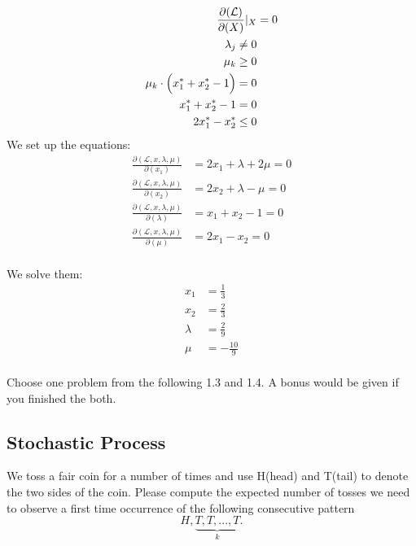 \documentclass[a4paper]{article}
\begin{document}
\begin{equation}
    \begin{aligned}
        \frac{\partial(\mathcal{L})}{\partial(X)}\arrowvert_{X} &=0\\
        \lambda_{j}  \ne 0 \\
        \mu_{k}  \ge 0\\
        \mu_{k} \cdot \Big(x_{1}^{*} + x_{2}^{*} - 1\Big) =0\\
        x_{1}^{*} + x_{2}^{*} - 1 = 0\\
        2x_{1}^{*}  - x_{2}^{*}  \le 0\\
    \end{aligned}
\end{equation}  
We set up the equations:
\begin{equation}
    \begin{aligned}
        \frac{\partial(\mathcal{L},x,\lambda, \mu)}{\partial(x_1)} &=2 x_1 + \lambda +2 \mu = 0\\
        \frac{\partial(\mathcal{L},x,\lambda, \mu)}{\partial(x_2)} &=2 x_2 + \lambda - \mu = 0\\
        \frac{\partial(\mathcal{L},x,\lambda, \mu)}{\partial(\lambda)} &= x_1 + x_2 -1  = 0\\
        \frac{\partial(\mathcal{L},x,\lambda, \mu)}{\partial(\mu)} &= 2 x_1 - x_2 = 0\\
    \end{aligned}
\end{equation} 

We solve them: 
\begin{equation}
    \begin{aligned}
        x_1 &= \frac{1}{3}\\
        x_2 &= \frac{2}{3}\\
        \lambda &= \frac{2}{9}\\
        \mu &= -\frac{10}{9}\\
    \end{aligned}
\end{equation}  

Choose one problem from the following 1.3 and 1.4. A bonus would be given if
you finished the both.

\subsection{Stochastic Process}
We toss a fair coin for a number of times and use H(head) and T(tail) to denote the two sides of the coin. Please compute the expected number of tosses we need to observe a first time occurrence of the following consecutive pattern
\begin{equation}
    H,\underbrace{T,T,...,T}_{k}.
\end{equation}
\end{document}
